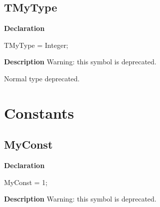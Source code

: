 \documentclass{report}
\newif\ifpdf
\begin{document}
\subsection*{TMyType}
\fi
\label{ok_deprecated_tag-TMyType}
\begin{list}{}{
\setlength{\itemindent}{0cm}
\setlength{\listparindent}{0cm}
\setlength{\leftmargin}{\evensidemargin}
\addtolength{\leftmargin}{\tmplength}
\settowidth{\labelsep}{X}
\addtolength{\leftmargin}{\labelsep}
\setlength{\labelwidth}{\tmplength}
}
\item[\textbf{Declaration}\hfill]
\ifpdf
\begin{flushleft}
\fi
\begin{ttfamily}
TMyType = Integer;\end{ttfamily}

\ifpdf
\end{flushleft}
\fi

\par
\item[\textbf{Description}]
Warning: this symbol is deprecated.

 Normal type deprecated.

\end{list}
\section{Constants}
\ifpdf
\subsection*{\large{\textbf{MyConst}}\normalsize\hspace{1ex}\hrulefill}
\else
\subsection*{MyConst}
\fi
\label{ok_deprecated_tag-MyConst}
\begin{list}{}{
\setlength{\itemindent}{0cm}
\setlength{\listparindent}{0cm}
\setlength{\leftmargin}{\evensidemargin}
\addtolength{\leftmargin}{\tmplength}
\settowidth{\labelsep}{X}
\addtolength{\leftmargin}{\labelsep}
\setlength{\labelwidth}{\tmplength}
}
\item[\textbf{Declaration}\hfill]
\ifpdf
\begin{flushleft}
\fi
\begin{ttfamily}
MyConst = 1;\end{ttfamily}

\ifpdf
\end{flushleft}
\fi

\par
\item[\textbf{Description}]
Warning: this symbol is deprecated.

 

\end{list}
\end{document}
